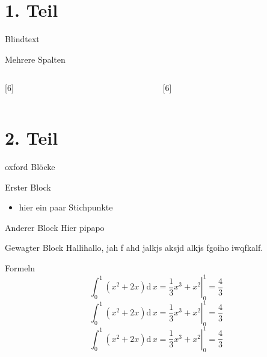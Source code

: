 


\frame{\maketitle}

\section{1. Teil}
\begin{frame}{Blindtext}
\blindtext

\end{frame}

\begin{frame}{Mehrere Spalten}
\begin{columns}[onlytextwidth]
\begin{column}{0.45\textwidth}
[6]
\end{column}
\begin{column}{0.45\textwidth}
  \pause
{}[6]
\end{column}
\end{columns}
\end{frame}

\section{2. Teil}
\begin{frame}{oxford Blöcke}
\begin{block}{Erster Block}
\begin{itemize}
  \item hier ein paar Stichpunkte
\end{itemize}
\end{block}
\begin{exampleblock}{Anderer Block}
Hier pipapo
\end{exampleblock}
\begin{alertblock}{Gewagter Block}
Hallihallo, jah f ahd jalkjs aksjd alkjs fgoiho iwqfkalf.
\end{alertblock}
\end{frame}

\begin{frame}{Formeln}
\begin{equation}
  \int_{0}^{1}  (x^2 + 2x)\mathup{d}\, x = \left. \frac{1}{3}x^3 + x^2\right|_0^{1} = \frac{4}{3}
\end{equation}
\begin{equation}
  \int_{0}^{1}  (x^2 + 2x)\mathup{d}\, x = \left. \frac{1}{3}x^3 + x^2\right|_0^{1} = \frac{4}{3}
\end{equation}
\begin{equation}
  \int_{0}^{1}  (x^2 + 2x)\mathup{d}\, x = \left. \frac{1}{3}x^3 + x^2\right|_0^{1} = \frac{4}{3}
\end{equation}
\end{frame}

